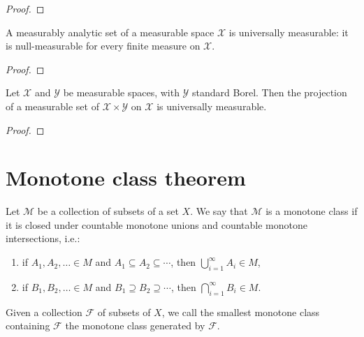 \begin{proof}\leanok

\end{proof}


\begin{lemma}\label{lem:IsMeasurableAnalytic.nullMeasurableSet}
  \leanok
A measurably analytic set of a measurable space $\mathcal{X}$ is universally measurable: it is null-measurable for every finite measure on $\mathcal{X}$.
\end{lemma}

\begin{proof}\leanok

\end{proof}


\begin{theorem}\label{thm:MeasurableSet.nullMeasurableSet_fst}
  \leanok
Let $\mathcal{X}$ and $\mathcal{Y}$ be measurable spaces, with $\mathcal{Y}$ standard Borel.
Then the projection of a measurable set of $\mathcal{X} \times \mathcal{Y}$ on $\mathcal{X}$ is universally measurable.
\end{theorem}

\begin{proof}\leanok

\end{proof}




\section{Monotone class theorem}


\begin{definition}\label{def:monotone_class}
  \leanok
Let $\mathcal{M}$ be a collection of subsets of a set $X$. We say that $\mathcal{M}$ is a monotone class if it is closed under countable monotone unions and countable monotone intersections, i.e.:
\begin{enumerate}
  \item if \( A_1, A_2, \ldots \in M \) and \( A_1 \subseteq A_2 \subseteq \cdots \), then
  \( \bigcup_{i=1}^\infty A_i \in M \),
  \item if \( B_1, B_2, \ldots \in M \) and \( B_1 \supseteq B_2 \supseteq \cdots \), then
  \( \bigcap_{i=1}^\infty B_i \in M \).
\end{enumerate}
Given a collection $\mathcal{F}$ of subsets of $X$, we call the smallest monotone class containing $\mathcal{F}$ the monotone class generated by $\mathcal{F}$.
\end{definition}


